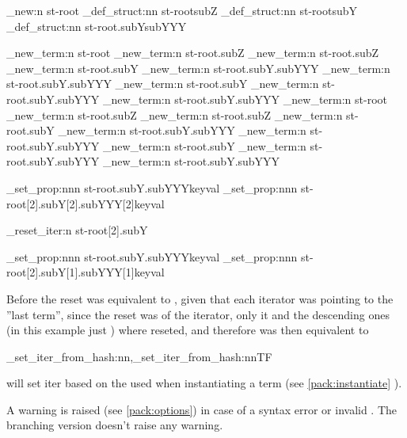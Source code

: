 \documentclass[10pt]{article}
\begin{document}
\begin{codestore}[store-env=demo7]
\starray_new:n {st-root}
\starray_def_struct:nn {st-root}{subZ}
\starray_def_struct:nn {st-root}{subY}
\starray_def_struct:nn {st-root.subY}{subYYY}

\starray_new_term:n {st-root}
\starray_new_term:n {st-root.subZ}
\starray_new_term:n {st-root.subZ}
\starray_new_term:n {st-root.subY}
\starray_new_term:n {st-root.subY.subYYY}
\starray_new_term:n {st-root.subY.subYYY}
\starray_new_term:n {st-root.subY}
\starray_new_term:n {st-root.subY.subYYY}
\starray_new_term:n {st-root.subY.subYYY}
\starray_new_term:n {st-root}
\starray_new_term:n {st-root.subZ}
\starray_new_term:n {st-root.subZ}
\starray_new_term:n {st-root.subY}
\starray_new_term:n {st-root.subY.subYYY}
\starray_new_term:n {st-root.subY.subYYY}
\starray_new_term:n {st-root.subY}
\starray_new_term:n {st-root.subY.subYYY}
\starray_new_term:n {st-root.subY.subYYY}

\starray_set_prop:nnn {st-root.subY.subYYY}{key}{val}
\starray_set_prop:nnn {st-root[2].subY[2].subYYY[2]}{key}{val}

\starray_reset_iter:n {st-root[2].subY}

\starray_set_prop:nnn {st-root.subY.subYYY}{key}{val}
\starray_set_prop:nnn {st-root[2].subY[1].subYYY[1]}{key}{val}
\end{codestore}


Before the reset  was equivalent to , given that each iterator was pointing to the ''last term'', since the reset was of the  iterator, only it and the descending ones (in this example just ) where reseted, and therefore  was then equivalent to 



\begin{codedescribe}[code,new=2023/11/04]{\starray_set_iter_from_hash:nn,\starray_set_iter_from_hash:nnTF}
\begin{codesyntax}%
\end{codesyntax}
\end{codedescribe}
 will set iter based on the  used when instantiating a term (see \ref{pack:instantiate} ).
\begin{tsremark}
A warning is raised (see \ref{pack:options}) in case of a  syntax error or invalid . The branching version doesn't raise any warning.
\end{tsremark}
\end{document}
